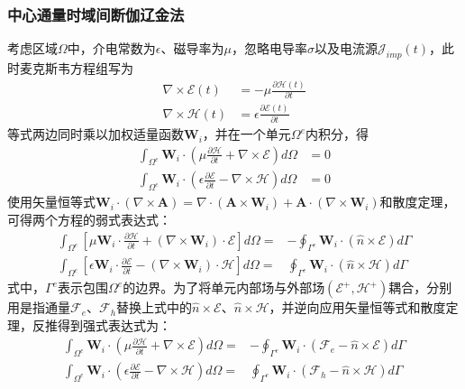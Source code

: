 \documentclass{article}
\numberwithin{equation}{section}
\renewcommand{\vec}[1]{\boldsymbol{#1}}
\begin{document}
\subsubsection{中心通量时域间断伽辽金法}
考虑区域$\Omega$中，介电常数为$\epsilon$、磁导率为$\mu$，忽略电导率$\sigma$以及电流源$\vec{\mathcal{J}}_{imp}(t)$，此时麦克斯韦方程组写为
\begin{align}
    \label{eq:eq802}
    \nabla \times \vec{\mathcal{E}}(t)&=-\mu\frac{\partial\vec{\mathcal{H}}(t)}{\partial t} \\
    \label{eq:eq803}
    \nabla \times \vec{\mathcal{H}}(t)&=\epsilon\frac{\partial\vec{\mathcal{E}}(t)}{\partial t}
\end{align}
等式两边同时乘以加权适量函数$\mathbf{W}_i$，并在一个单元$\Omega^e$内积分，得
\begin{align}
    \label{eq:eq804}
    \int_{\Omega^e}\mathbf{W}_i\cdot\left(\mu\frac{\partial\vec{\mathcal{H}}}{\partial t}+\nabla \times \vec{\mathcal{E}}\right)d\Omega&=0 \\
    \label{eq:eq805}
    \int_{\Omega^e}\mathbf{W}_i\cdot\left(\epsilon\frac{\partial\vec{\mathcal{E}}}{\partial t}-\nabla \times \vec{\mathcal{H}}\right)d\Omega&=0
\end{align}
使用矢量恒等式$\mathbf{W}_i\cdot(\nabla\times\mathbf{A})=\nabla\cdot(\mathbf{A}\times\mathbf{W}_i)+\mathbf{A}\cdot(\nabla\times\mathbf{W}_i)$和散度定理，可得两个方程的弱式表达式：
\begin{align}
    \label{eq:eq806}
    \int_{\Omega^e}\left[\mu\mathbf{W}_i\cdot\frac{\partial\vec{\mathcal{H}}}{\partial t}+(\nabla\times\mathbf{W}_i)\cdot\vec{\mathcal{E}}\right]d\Omega=&-\oint_{\Gamma^e}\mathbf{W}_i\cdot(\hat{n}\times\vec{\mathcal{E}})d\Gamma \\
    \label{eq:eq807}
    \int_{\Omega^e}\left[\epsilon\mathbf{W}_i\cdot\frac{\partial\vec{\mathcal{E}}}{\partial t}-(\nabla\times\mathbf{W}_i)\cdot\vec{\mathcal{H}}\right]d\Omega=&\oint_{\Gamma^e}\mathbf{W}_i\cdot(\hat{n}\times\vec{\mathcal{H}})d\Gamma
\end{align}
式中，$\Gamma^e$表示包围$\Omega^e$的边界。为了将单元内部场与外部场$(\vec{\mathcal{E}}^+,\vec{\mathcal{H}}^+)$耦合，分别用是指通量$\vec{\mathcal{F}}_e$、$\vec{\mathcal{F}}_h$替换上式中的$\hat{n}\times\vec{\mathcal{E}}$、$\hat{n}\times\vec{\mathcal{H}}$，并逆向应用矢量恒等式和散度定理，反推得到强式表达式为：
\begin{align}
    \label{eq:eq808}
    \int_{\Omega^e}\mathbf{W}_i\cdot\left(\mu\frac{\partial\vec{\mathcal{H}}}{\partial t}+\nabla\times\vec{\mathcal{E}}\right)d\Omega=&-\oint_{\Gamma^e}\mathbf{W}_i\cdot(\vec{\mathcal{F}}_e-\hat{n}\times\vec{\mathcal{E}})d\Gamma \\
    \label{eq:eq809}
    \int_{\Omega^e}\mathbf{W}_i\cdot\left(\epsilon\frac{\partial\vec{\mathcal{E}}}{\partial t}-\nabla\times\vec{\mathcal{H}}\right)d\Omega=&\oint_{\Gamma^e}\mathbf{W}_i\cdot(\vec{\mathcal{F}}_h-\hat{n}\times\vec{\mathcal{H}})d\Gamma
\end{align}
\end{document}
